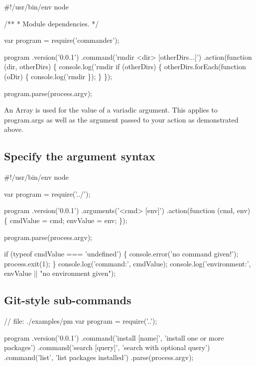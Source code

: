 \begin{DoxyCode}
#!/usr/bin/env node

/**
 * Module dependencies.
 */

var program = require('commander');

program
  .version('0.0.1')
  .command('rmdir <dir> [otherDirs...]')
  .action(function (dir, otherDirs) \{
    console.log('rmdir %
    if (otherDirs) \{
      otherDirs.forEach(function (oDir) \{
        console.log('rmdir %
      \});
    \}
  \});

program.parse(process.argv);
\end{DoxyCode}


An {\ttfamily Array} is used for the value of a variadic argument. This applies to {\ttfamily program.\+args} as well as the argument passed to your action as demonstrated above.

\subsection*{Specify the argument syntax}


\begin{DoxyCode}
#!/usr/bin/env node

var program = require('../');

program
  .version('0.0.1')
  .arguments('<cmd> [env]')
  .action(function (cmd, env) \{
     cmdValue = cmd;
     envValue = env;
  \});

program.parse(process.argv);

if (typeof cmdValue === 'undefined') \{
   console.error('no command given!');
   process.exit(1);
\}
console.log('command:', cmdValue);
console.log('environment:', envValue || "no environment given");
\end{DoxyCode}


\subsection*{Git-\/style sub-\/commands}


\begin{DoxyCode}
// file: ./examples/pm
var program = require('..');

program
  .version('0.0.1')
  .command('install [name]', 'install one or more packages')
  .command('search [query]', 'search with optional query')
  .command('list', 'list packages installed')
  .parse(process.argv);
\end{DoxyCode}


